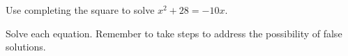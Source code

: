 \documentclass[addpoints, 12pt]{exam}
\begin{document}
\begin{questions}

\newpage

\question[9]
Use completing the square to solve $x^2 + 28 = - 10x$.

\newpage

\question[10]
Solve each equation.  Remember to take steps to address the possibility of false solutions.



\end{questions}
\end{document}
